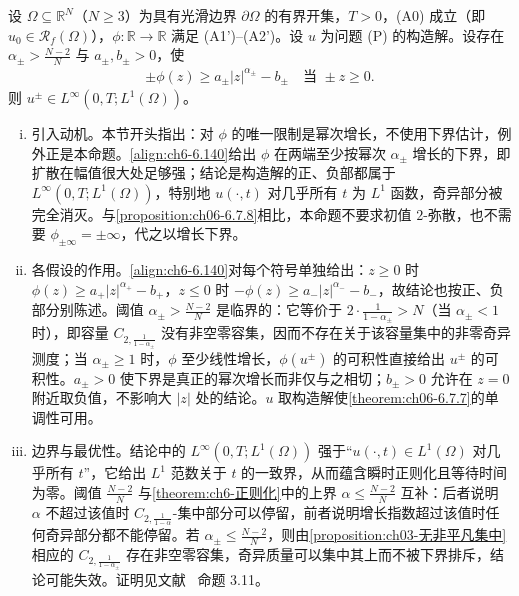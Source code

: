 \documentclass[../../main.tex]{subfiles}%
\begin{document}
\begin{proposition}\label{proposition:ch06-6.7.9}
设 $\Omega\subseteq\mathbb{R}^N$（$N\geqslant3$）为具有光滑边界 $\partial\Omega$ 的有界开集，$T>0$，(A0) 成立（即 $u_0\in\mathscr{R}_f(\Omega)$），$\phi:\mathbb{R}\to\mathbb{R}$ 满足 (A1')--(A2')。设 $u$ 为问题 (P) 的构造解。设存在 $\alpha_\pm>\frac{N-2}{N}$ 与 $a_\pm,b_\pm>0$，使
\begin{align}
\pm\phi(z)\geqslant a_\pm|z|^{\alpha_\pm}-b_\pm\quad\text{当 }\pm z\geqslant0. \label{align:ch6-6.140}
\end{align}
则 $u^\pm\in L^\infty(0,T;L^1(\Omega))$。
\end{proposition}

\begin{remark}\label{remark:ch06-6.7.9动机}
\begin{enumerate}[(i)]
\item 引入动机。本节开头指出：对 $\phi$ 的唯一限制是幂次增长，不使用下界估计，例外正是本命题。\eqref{align:ch6-6.140}给出 $\phi$ 在两端至少按幂次 $\alpha_\pm$ 增长的下界，即扩散在幅值很大处足够强；结论是构造解的正、负部都属于 $L^\infty(0,T;L^1(\Omega))$，特别地 $u(\cdot,t)$ 对几乎所有 $t$ 为 $L^1$ 函数，奇异部分被完全消灭。与\cref{proposition:ch06-6.7.8}相比，本命题不要求初值 $2$-弥散，也不需要 $\phi_{\pm\infty}=\pm\infty$，代之以增长下界。

\item 各假设的作用。\eqref{align:ch6-6.140}对每个符号单独给出：$z\geqslant0$ 时 $\phi(z)\geqslant a_+|z|^{\alpha_+}-b_+$，$z\leqslant0$ 时 $-\phi(z)\geqslant a_-|z|^{\alpha_-}-b_-$，故结论也按正、负部分别陈述。阈值 $\alpha_\pm>\frac{N-2}{N}$ 是临界的：它等价于 $2\cdot\frac{1}{1-\alpha_\pm}>N$（当 $\alpha_\pm<1$ 时），即容量 $C_{2,\frac{1}{1-\alpha_\pm}}$ 没有非空零容集，因而不存在关于该容量集中的非零奇异测度；当 $\alpha_\pm\geqslant1$ 时，$\phi$ 至少线性增长，$\phi(u^\pm)$ 的可积性直接给出 $u^\pm$ 的可积性。$a_\pm>0$ 使下界是真正的幂次增长而非仅与之相切；$b_\pm>0$ 允许在 $z=0$ 附近取负值，不影响大 $|z|$ 处的结论。$u$ 取构造解使\cref{theorem:ch06-6.7.7}的单调性可用。

\item 边界与最优性。结论中的 $L^\infty(0,T;L^1(\Omega))$ 强于“$u(\cdot,t)\in L^1(\Omega)$ 对几乎所有 $t$”，它给出 $L^1$ 范数关于 $t$ 的一致界，从而蕴含瞬时正则化且等待时间为零。阈值 $\frac{N-2}{N}$ 与\cref{theorem:ch6-正则化}中的上界 $\alpha\leqslant\frac{N-2}{N}$ 互补：后者说明 $\alpha$ 不超过该值时 $C_{2,\frac{1}{1-\alpha}}$-集中部分可以停留，前者说明增长指数超过该值时任何奇异部分都不能停留。若 $\alpha_\pm\leqslant\frac{N-2}{N}$，则由\cref{proposition:ch03-无非平凡集中}相应的 $C_{2,\frac{1}{1-\alpha_\pm}}$ 存在非空零容集，奇异质量可以集中其上而不被下界排斥，结论可能失效。证明见文献~\cite{ref87} 命题 3.11。
\end{enumerate}
\end{remark}
\end{document}
